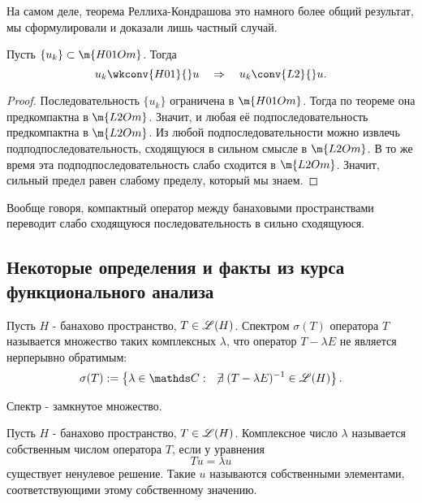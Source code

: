 \begin{note}
На самом деле, теорема Реллиха-Кондрашова это намного более общий результат, мы сформулировали и доказали лишь частный случай. 
\end{note}

\begin{corollary} Пусть $\{ u_k \} \subset \m{H01Om}$. Тогда
$$ u_k \wkconv{H01}{} u \quad \Rightarrow \quad u_k \conv{L2}{} u.$$
\end{corollary}
\begin{proof}
Последовательность $\{ u_k \}$ ограничена в $\m{H01Om}$. Тогда по теореме она предкомпактна в $\m{L2Om}$. Значит, и любая её подпоследовательность предкомпактна в $\m{L2Om}$. Из любой подпоследовательности можно извлечь подподпоследовательность, сходящуюся в сильном смысле в $\m{L2Om}$. В то же время эта подподпоследовательность слабо сходится в $\m{L2Om}$. Значит, сильный предел равен слабому пределу, который мы знаем.

\end{proof}

\begin{note} Вообще говоря, компактный оператор между банаховыми пространствами переводит слабо сходящуюся последовательность в сильно сходящуюся.
\end{note}

\subsection*{Некоторые определения и факты из курса функционального анализа}

\begin{definition} Пусть $H$ - банахово пространство, $T \in \mathscr{L}(H)$. Спектром $\sigma (T)$ оператора $T$ называется множество таких комплексных $\lambda$, что оператор $T - \lambda E$ не является нерперывно обратимым:
$$ \sigma(T) := \left\{ \lambda \in \complex : \quad \centernot\exists (T - \lambda E)^{-1} \in \linop(H) \right\}.$$
\end{definition}

\begin{note}
Спектр - замкнутое множество.
\end{note}

\begin{definition} Пусть $H$ - банахово пространство, $T \in \mathscr{L}(H)$. Комплексное число $\lambda$ называется собственным числом оператора $T$, если у уравнения
$$ Tu = \lambda u$$
существует ненулевое решение. Такие $u$ называются собственными элементами, соответствующими этому собственному значению.
\end{definition}

